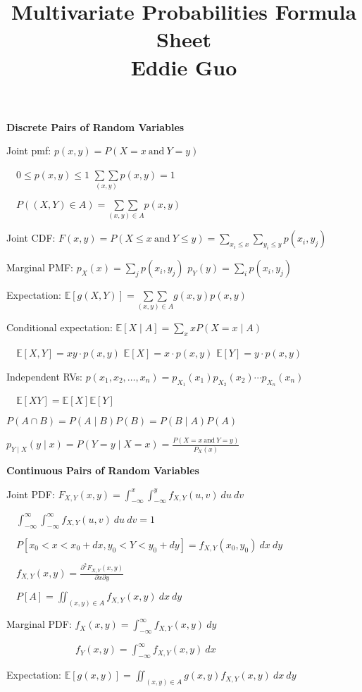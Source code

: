 \documentclass[twocolumn]{article}
\title{
	\vspace{-2em}
	\normalsize \textbf{Multivariate Probabilities Formula Sheet} \\
	\small Eddie Guo \\
	\dotfill
	\vspace{-5em}
}
\date{}
\begin{document}
\maketitle

\small

\textbf{Discrete Pairs of Random Variables}

Joint pmf: $p(x, y) = P(X=x\ \text{and}\ Y=y)$

$\quad 0 \leq p(x, y) \leq 1$ \hfill $\underset{(x,y)}{\sum\sum} p(x,y) = 1$

$\quad P((X, Y) \in A) = \underset{(x,y) \in A}{\sum\sum} p(x, y)$

Joint CDF: $F(x, y) = P(X \leq x\ \text{and}\ Y \leq y) = \sum_{x_i \leq x} \sum_{y_i \leq y} p(x_i, y_j)$

Marginal PMF: $p_X(x) = \sum_j p(x_i, y_j)$ \hfill $p_Y(y) = \sum_i p(x_i, y_j)$

Expectation: $\mathbb E[g(X, Y)] = \underset{(x,y) \in A}{\sum\sum} g(x,y) p(x, y)$

Conditional expectation: $\mathbb E[X \mid A] = \sum_x x P(X = x \mid A)$

$\quad \mathbb E[X, Y] = xy \cdot p(x, y)$ \hfill $\mathbb E[X] = x \cdot p(x, y)$  \hfill $\mathbb E[Y] = y \cdot p(x, y)$

Independent RVs: $p(x_1, x_2, \dots, x_n) = p_{X_1}(x_1) p_{X_2}(x_2) \cdots p_{X_n}(x_n)$

$\quad \mathbb E[XY] = \mathbb E[X] \mathbb E[Y]$

$P(A \cap B) = P(A \mid B) P(B) = P(B \mid A) P(A)$

$p_{Y \mid X} (y \mid x) = P(Y=y \mid X = x) = \frac{P(X=x\ \text{and}\ Y=y)}{P_X(x)}$

\newpage

\textbf{Continuous Pairs of Random Variables}

Joint PDF: $F_{X,Y}(x, y) = \int_{-\infty}^x \int_{-\infty}^y f_{X,Y}(u, v)\ du\ dv$

$\quad \int_{-\infty}^\infty \int_{-\infty}^\infty f_{X,Y}(u,v)\ du\ dv = 1$

$\quad P[x_0 < x < x_0 + dx, y_0 < Y < y_0 + dy] = f_{X,Y}(x_0, y_0)\ dx\ dy$

$\quad f_{X, Y}(x,y) = \frac{\partial^2 F_{X,Y}(x,y)}{\partial x \partial y}$

$\quad P[A] = \iint_{(x,y) \in A} f_{X,Y}(x,y)\ dx\ dy$

Marginal PDF: $f_X(x,y) = \int_{-\infty}^\infty f_{X,Y}(x, y)\ dy$

$\hspace{7em} f_Y(x,y) = \int_{-\infty}^\infty f_{X,Y}(x, y)\ dx$

Expectation: $\mathbb E[g(x,y)] = \iint_{(x,y) \in A} g(x,y) f_{X,Y}(x,y)\ dx\ dy$
\end{document}
